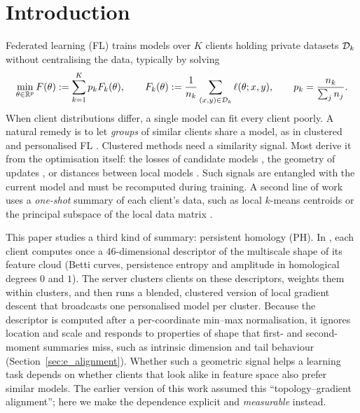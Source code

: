 
\section{Introduction}
\label{sec:intro}

Federated learning (FL) \citep{mcmahan2017communication,kairouz2021advances} trains models
over $K$ clients holding private datasets $\mathcal{D}_k$ without centralising the data, typically
by solving
\begin{equation}
  \min_{\theta\in\mathbb{R}^p} F(\theta):=\sum_{k=1}^K p_k F_k(\theta),
  \qquad F_k(\theta):=\frac{1}{n_k}\sum_{(x,y)\in\mathcal{D}_k}\ell(\theta;x,y),
  \qquad p_k=\frac{n_k}{\sum_j n_j}.
  \label{eq:global_obj}
\end{equation}
When client distributions differ, a single model can fit every client poorly. A natural
remedy is to let \emph{groups} of similar clients share a model, as in clustered and
personalised FL \citep{ghosh2020efficient,sattler2020clustered,long2023multi,t2020personalized,li2021ditto}.
Clustered methods need a similarity signal. Most derive it from the optimisation itself:
the losses of candidate models \citep[IFCA;][]{ghosh2020efficient}, the geometry of
updates \citep[CFL;][]{sattler2020clustered,briggs2020federated}, or distances between local
models \citep[FeSEM;][]{long2023multi}. Such signals are entangled with the current model
and must be recomputed during training. A second line of work uses a \emph{one-shot}
summary of each client's data, such as local $k$-means centroids
\citep{dennis2021heterogeneity} or the principal subspace of the local data matrix
\citep[PACFL;][]{vahidian2023efficient}.

This paper studies a third kind of summary: persistent homology (PH). In \ptopofl, each
client computes once a $46$-dimensional descriptor of the multiscale shape of its feature
cloud (Betti curves, persistence entropy and amplitude in homological degrees $0$ and $1$).
The server clusters clients on these descriptors, weights them within clusters, and then
runs a blended, clustered version of local gradient descent that broadcasts one
personalised model per cluster. Because the descriptor is computed after a per-coordinate
min--max normalisation, it ignores location and scale and responds to properties of shape
that first- and second-moment summaries miss, such as intrinsic dimension and tail
behaviour (Section~\ref{sec:e_alignment}). Whether such a geometric signal helps a learning
task depends on whether clients that look alike in feature space also prefer similar
models. The earlier version of this work assumed this ``topology--gradient alignment''; here
we make the dependence explicit and \emph{measurable} instead.

